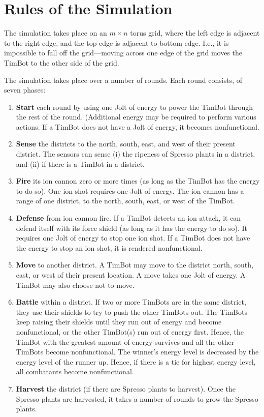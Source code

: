 \documentclass[12pt,pdftex]{article}
\begin{document}
\section*{Rules of the Simulation} 
The simulation takes place on an $m \times n$ torus grid, where the
left edge is adjacent to the right edge, and the top edge is adjacent
to bottom edge.  I.e., it is impossible to fall off the grid---moving
across one edge of the grid moves the TimBot to the other side of
the grid.

The simulation takes place over a number of rounds.  Each round consists,
of seven phases:
\begin{enumerate}\NoItemSpace
\item {\bf Start} each round by using one Jolt of energy to power the TimBot
      through the rest of the round. (Additional energy may be required to
      perform various actions.  If a TimBot does not have a Jolt of energy,
      it becomes nonfunctional.

\item {\bf Sense} the districts to the north, south, east, and west of
      their present district.  The sensors can sense (i) the ripeness
      of Spresso plants in a district, and (ii) if there is a TimBot
      in a district.

\item {\bf Fire} its ion cannon zero or more times (as long as the
      TimBot has the energy to do so).  One ion shot requires one
      Jolt of energy.  The ion cannon has a range of one district,
      to the north, south, east, or west of the TimBot.  

\item {\bf Defense} from ion cannon fire.  If a TimBot detects an 
      ion attack, it can defend itself with its force shield (as
      long as it has the energy to do so).  It requires one Jolt
      of energy to stop one ion shot.  If a TimBot does not have
      the energy to stop an ion shot, it is rendered nonfunctional.

\item {\bf Move} to another district.  A TimBot may move to the
      district north, south, east, or west of their present location.
      A move takes one Jolt of energy.   A TimBot may also choose not
      to move.

\item {\bf Battle} within a district.  If two or more TimBots are
      in the same district, they use their shields to try to push
      the other TimBots out.  The TimBots keep raising their shields
      until they run out of energy and become nonfunctional, or the
      other TimBot(s) run out of energy first.  Hence, the
      TimBot with the greatest amount of energy survives and all
      the other TimBots become nonfunctional.  The winner's energy
      level is decreased by the energy level of the runner up.
      Hence, if there is a tie for highest energy level, all
      combatants become nonfunctional.

\item {\bf Harvest} the district (if there are Spresso plants to harvest).
      Once the Spresso plants are harvested, it takes a number of rounds
      to grow the Spresso plants.
\end{enumerate}
\end{document}
